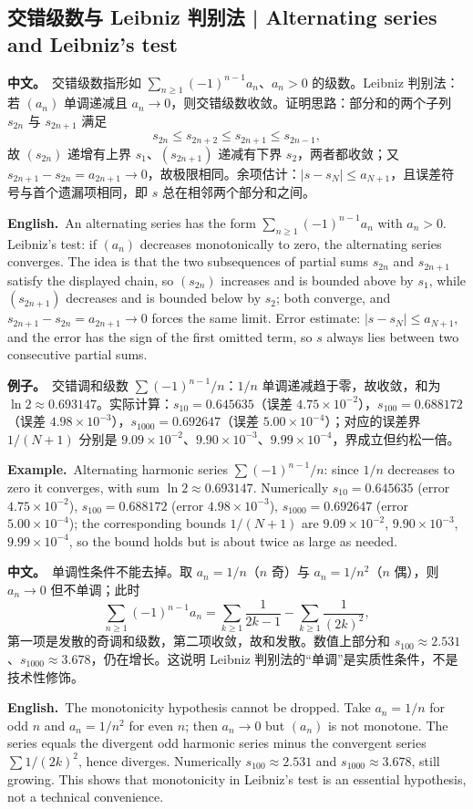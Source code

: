 \documentclass[UTF8,11pt,a4paper]{ctexart}
\newcommand{\BOTH}[2]{\par\noindent\textbf{中文。}\ #1\par\noindent\textbf{English.}\ #2\par}
\newcommand{\EX}[2]{\par\noindent\textbf{例子。}\ #1\par\noindent\textbf{Example.}\ #2\par}
\begin{document}
\subsection{交错级数与 Leibniz 判别法 | Alternating series and Leibniz's test}
\BOTH{交错级数指形如 $\sum_{n\ge1}(-1)^{n-1}a_n$、$a_n>0$ 的级数。Leibniz 判别法：若 $(a_n)$ 单调递减且 $a_n\to0$，则交错级数收敛。证明思路：部分和的两个子列 $s_{2n}$ 与 $s_{2n+1}$ 满足
\[
s_{2n}\le s_{2n+2}\le s_{2n+1}\le s_{2n-1},
\]
故 $(s_{2n})$ 递增有上界 $s_1$、$(s_{2n+1})$ 递减有下界 $s_2$，两者都收敛；又 $s_{2n+1}-s_{2n}=a_{2n+1}\to0$，故极限相同。余项估计：$|s-s_N|\le a_{N+1}$，且误差符号与首个遗漏项相同，即 $s$ 总在相邻两个部分和之间。}{An alternating series has the form $\sum_{n\ge1}(-1)^{n-1}a_n$ with $a_n>0$. Leibniz's test: if $(a_n)$ decreases monotonically to zero, the alternating series converges. The idea is that the two subsequences of partial sums $s_{2n}$ and $s_{2n+1}$ satisfy the displayed chain, so $(s_{2n})$ increases and is bounded above by $s_1$, while $(s_{2n+1})$ decreases and is bounded below by $s_2$; both converge, and $s_{2n+1}-s_{2n}=a_{2n+1}\to0$ forces the same limit. Error estimate: $|s-s_N|\le a_{N+1}$, and the error has the sign of the first omitted term, so $s$ always lies between two consecutive partial sums.}
\EX{交错调和级数 $\sum(-1)^{n-1}/n$：$1/n$ 单调递减趋于零，故收敛，和为 $\ln2\approx0.693147$。实际计算：$s_{10}=0.645635$（误差 $4.75\times10^{-2}$），$s_{100}=0.688172$（误差 $4.98\times10^{-3}$），$s_{1000}=0.692647$（误差 $5.00\times10^{-4}$）；对应的误差界 $1/(N+1)$ 分别是 $9.09\times10^{-2}$、$9.90\times10^{-3}$、$9.99\times10^{-4}$，界成立但约松一倍。}{Alternating harmonic series $\sum(-1)^{n-1}/n$: since $1/n$ decreases to zero it converges, with sum $\ln2\approx0.693147$. Numerically $s_{10}=0.645635$ (error $4.75\times10^{-2}$), $s_{100}=0.688172$ (error $4.98\times10^{-3}$), $s_{1000}=0.692647$ (error $5.00\times10^{-4}$); the corresponding bounds $1/(N+1)$ are $9.09\times10^{-2}$, $9.90\times10^{-3}$, $9.99\times10^{-4}$, so the bound holds but is about twice as large as needed.}
\BOTH{单调性条件不能去掉。取 $a_n=1/n$（$n$ 奇）与 $a_n=1/n^2$（$n$ 偶），则 $a_n\to0$ 但不单调；此时
\[
\sum_{n\ge1}(-1)^{n-1}a_n=\sum_{k\ge1}\frac1{2k-1}-\sum_{k\ge1}\frac1{(2k)^2},
\]
第一项是发散的奇调和级数，第二项收敛，故和发散。数值上部分和 $s_{100}\approx2.531$、$s_{1000}\approx3.678$，仍在增长。这说明 Leibniz 判别法的“单调”是实质性条件，不是技术性修饰。}{The monotonicity hypothesis cannot be dropped. Take $a_n=1/n$ for odd $n$ and $a_n=1/n^2$ for even $n$; then $a_n\to0$ but $(a_n)$ is not monotone. The series equals the divergent odd harmonic series minus the convergent series $\sum1/(2k)^2$, hence diverges. Numerically $s_{100}\approx2.531$ and $s_{1000}\approx3.678$, still growing. This shows that monotonicity in Leibniz's test is an essential hypothesis, not a technical convenience.}
\end{document}
